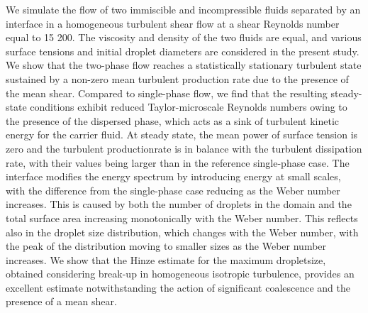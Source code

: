 \begin{paper}

\makepapertitle

%
\begin{paperabstract}
We  simulate  the  flow  of  two  immiscible  and  incompressible  fluids  separated  by  an interface  in  a  homogeneous  turbulent  shear  flow  at  a  shear  Reynolds  number  equal to  15 200.  The  viscosity  and  density  of  the  two  fluids  are  equal,  and  various  surface tensions  and  initial  droplet  diameters  are  considered  in  the  present  study.  We  show that  the  two-phase  flow  reaches  a  statistically  stationary  turbulent  state  sustained  by a  non-zero  mean  turbulent  production  rate  due  to  the  presence  of  the  mean  shear. Compared  to  single-phase  flow,  we  find  that  the  resulting  steady-state  conditions exhibit  reduced  Taylor-microscale  Reynolds  numbers  owing  to  the  presence  of  the dispersed  phase,  which  acts  as  a  sink  of  turbulent  kinetic  energy  for  the  carrier  fluid. At steady state, the mean power of surface tension is zero and the turbulent productionrate  is  in  balance  with  the  turbulent  dissipation  rate,  with  their  values  being  larger than  in  the  reference  single-phase  case.  The  interface  modifies  the  energy  spectrum by  introducing  energy  at  small  scales,  with  the  difference  from  the  single-phase  case reducing  as  the  Weber  number  increases.  This  is  caused  by  both  the  number  of droplets  in  the  domain  and  the  total  surface  area  increasing  monotonically  with  the Weber  number.  This  reflects  also  in  the  droplet  size  distribution,  which  changes  with the  Weber  number,  with  the  peak  of  the  distribution  moving  to  smaller  sizes  as  the Weber  number  increases.  We  show  that  the  Hinze  estimate  for  the  maximum  dropletsize,  obtained  considering  break-up  in  homogeneous  isotropic  turbulence,  provides an  excellent  estimate  notwithstanding  the  action  of  significant  coalescence  and  the presence  of  a  mean  shear.
\end{paperabstract}


%



%


%

\end{paper}
